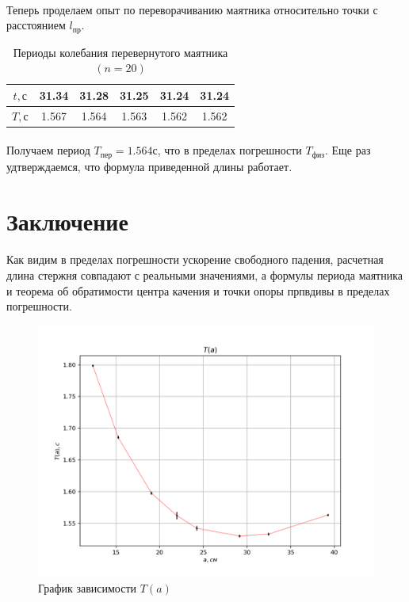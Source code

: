 \documentclass[a4paper, 12pt]{article}
\begin{document}
    \paragraph{}
    Теперь проделаем опыт по переворачиванию маятника относительно точки с расстоянием $l_{пр}$.

    \begin{table}[h!]
        \begin{center}

         \begin{tabular}{|c|c|c|c|c|c|}
            \hline
            \textbf{$t, с$} & 31.34 & 31.28 & 31.25 & 31.24 & 31.24\\
            \hline
            \textbf{$T,с$} & 1.567 & 1.564 & 1.563 & 1.562 & 1.562\\
            \hline
         \end{tabular}
         \caption{Периоды колебания перевернутого маятника $(n=20)$}
        \end{center}

    \end{table}
    \paragraph{}
    Получаем период $T_{пер}=1.564с$, что в пределах погрешности $T_{физ}$. Еще раз удтверждаемся, что формула приведенной длины работает.

    \section{Заключение}
    \paragraph{}
    Как видим в пределах погрешности ускорение свободного падения, расчетная длина стержня совпадают с реальными значениями, а формулы периода маятника и теорема об обратимости центра качения и точки опоры прпвдивы в пределах погрешности.
    \newpage
    \begin{figure}
        \includegraphics[scale=1.2]{plot1.png}
        \caption{График зависимости $T(a)$}
    \end{figure}
\end{document}
